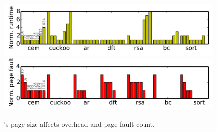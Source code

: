 \begin{figure}
	\centering
	\includegraphics[width=\columnwidth]{figures/pagSizeOverhead}
	\includegraphics[width=\columnwidth]{figures/pagefault}
	\caption{\sys's page size affects overhead and page fault count.}
	\label{fig:IPOSPerformance}
	\label{fig:page_size}
\end{figure}





 
